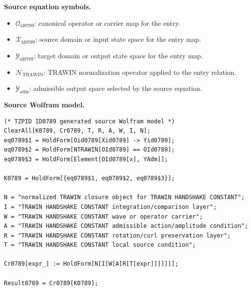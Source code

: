 \begin{minipage}[t]{0.49\linewidth}
\begingroup
\small
\raggedright
\textbf{Source equation symbols.}\par
\begin{itemize}[leftmargin=1.35em,itemsep=1pt,topsep=1pt,parsep=0pt]
    \item $\mathcal{O}_{\mathrm{id0789}}$: canonical operator or carrier map for the entry.
    \item $\mathcal{X}_{\mathrm{id0789}}$: source domain or input state space for the entry map.
    \item $\mathcal{Y}_{\mathrm{id0789}}$: target domain or output state space for the entry map.
    \item $\mathcal{N}_{\mathrm{TRAWIN}}$: TRAWIN normalization operator applied to the entry relation.
    \item $\mathcal{Y}_{\mathrm{adm}}$: admissible output space selected by the source equation.
\end{itemize}
\endgroup
\end{minipage}\hfill
\begin{minipage}[t]{0.47\linewidth}
\begingroup
\scriptsize
\raggedright
\textbf{Source Wolfram model.}\par
\begin{Verbatim}[fontsize=\tiny,breaklines=true,breakanywhere=true]
(* TZPID ID0789 generated source Wolfram model *)
ClearAll[K0789, Cr0789, T, R, A, W, I, N];
eq0789$1 = HoldForm[Oid0789[Xid0789] -> Yid0789];
eq0789$2 = HoldForm[NTRAWIN[OId0789] == OId0789];
eq0789$3 = HoldForm[Element[OId0789[x], YAdm]];

K0789 = HoldForm[{eq0789$1, eq0789$2, eq0789$3}];

N = "normalized TRAWIN closure object for TRAWIN HANDSHAKE CONSTANT";
I = "TRAWIN HANDSHAKE CONSTANT integration/comparison layer";
W = "TRAWIN HANDSHAKE CONSTANT wave or operator carrier";
A = "TRAWIN HANDSHAKE CONSTANT admissible action/amplitude condition";
R = "TRAWIN HANDSHAKE CONSTANT rotation/curl preservation layer";
T = "TRAWIN HANDSHAKE CONSTANT local source condition";

Cr0789[expr_] := HoldForm[N[I[W[A[R[T[expr]]]]]]];

Result0789 = Cr0789[K0789];
\end{Verbatim}
\endgroup
\end{minipage}

